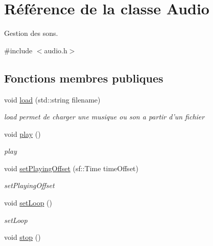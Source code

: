 \hypertarget{class_audio}{\section{Référence de la classe Audio}
\label{class_audio}
}


Gestion des sons.  




{\ttfamily \#include $<$audio.\+h$>$}

\subsection*{Fonctions membres publiques}
\begin{DoxyCompactItemize}
\item 
void \hyperlink{class_audio_a596b80f334654590bd5d0e491af00794}{load} (std\+::string filename)
\begin{DoxyCompactList}\small\item\em load permet de charger une musique ou son a partir d'un fichier \end{DoxyCompactList}\item 
\hypertarget{class_audio_a2916f9015031bee9abb98adf0d83e7ee}{void \hyperlink{class_audio_a2916f9015031bee9abb98adf0d83e7ee}{play} ()}\label{class_audio_a2916f9015031bee9abb98adf0d83e7ee}

\begin{DoxyCompactList}\small\item\em play \end{DoxyCompactList}\item 
void \hyperlink{class_audio_ab892072917af295d312108f256f02efc}{set\+Playing\+Offset} (sf\+::\+Time time\+Offset)
\begin{DoxyCompactList}\small\item\em set\+Playing\+Offset \end{DoxyCompactList}\item 
\hypertarget{class_audio_aa07265755ef4e0006ef5c1847671e786}{void \hyperlink{class_audio_aa07265755ef4e0006ef5c1847671e786}{set\+Loop} ()}\label{class_audio_aa07265755ef4e0006ef5c1847671e786}

\begin{DoxyCompactList}\small\item\em set\+Loop \end{DoxyCompactList}\item 
\hypertarget{class_audio_af628fdffa4dba3866e6e801fdda123ea}{void \hyperlink{class_audio_af628fdffa4dba3866e6e801fdda123ea}{stop} ()}\label{class_audio_af628fdffa4dba3866e6e801fdda123ea}


\end{DoxyCompactItemize}
